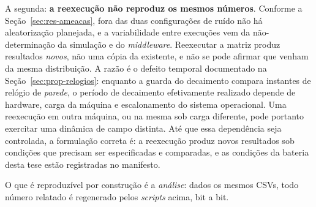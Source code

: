 A segunda: \textbf{a reexecução não reproduz os mesmos números}. Conforme a
Seção~\ref{sec:res-ameacas}, fora das duas configurações de ruído não há aleatorização
planejada, e a variabilidade entre execuções vem da não-determinação da simulação e do
\textit{middleware}. %
Reexecutar a matriz produz resultados \emph{novos}, não uma cópia da existente, e
não se pode afirmar que venham da mesma distribuição. A razão é o defeito temporal
documentado na Seção~\ref{sec:prop-relogios}: enquanto a guarda do decaimento compara
instantes de relógio de \emph{parede}, o período de decaimento efetivamente realizado
depende de hardware, carga da máquina e escalonamento do sistema operacional. Uma
reexecução em outra máquina, ou na mesma sob carga diferente, pode portanto exercitar
uma dinâmica de campo distinta. Até que essa dependência seja controlada, a formulação
correta é: a reexecução produz novos resultados sob condições que precisam ser
especificadas e comparadas, e as condições da bateria desta tese estão registradas
no manifesto.

O que é reproduzível por construção é a \emph{análise}:
dados os mesmos CSVs, todo número relatado é regenerado pelos \textit{scripts} acima,
bit a bit.
